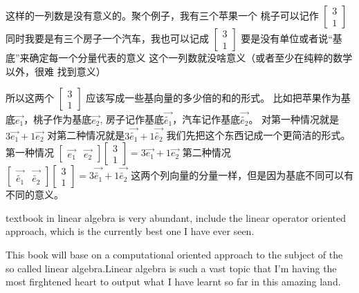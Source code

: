 \documentclass{book}
\begin{document}
\begin{CJK}{UTF8}{gbsn}
    这样的一列数是没有意义的。聚个例子，我有三个苹果一个
    桃子可以记作
    $\left[\begin{matrix}
                3 \\
                1
            \end{matrix}\right]$
    同时我要是有三个房子一个汽车，我也可以记成
    $\left[\begin{matrix}
                3 \\
                1
            \end{matrix}\right]$
    要是没有单位或者说“基底”来确定每一个分量代表的意义
    这个一列数就没啥意义（或者至少在纯粹的数学以外，很难
    找到意义）

    所以这两个
    $\left[\begin{matrix}
                3 \\
                1
            \end{matrix}\right]$
    应该写成一些基向量的多少倍的和的形式。
    比如把苹果作为基底$\vec{e_1}$，桃子作为基底$\vec{e_2}$,
    房子记作基底$\vec{\tilde{e_1}}$，汽车记作基底$\vec{\tilde{e_2}}$。
    对第一种情况就是$3\vec{e_1}+1\vec{e_2}$
    对第二种情况就是$3\vec{\tilde{e_1}}+1\vec{\tilde{e_2}}$
    我们先把这个东西记成一个更简洁的形式。
    第一种情况
    $\left[\begin{matrix}
                \vec{e_1} & \vec{e_2}
            \end{matrix}\right]
        \left[\begin{matrix}
                3 \\
                1
            \end{matrix}\right]=3\vec{e_1}+1\vec{e_2}$
    第二种情况
    $\left[\begin{matrix}
                \vec{\tilde{e_1}} & \vec{\tilde{e_2}}
            \end{matrix}\right]
        \left[\begin{matrix}
                3 \\
                1
            \end{matrix}\right]=3\vec{\tilde{e_1}}+1\vec{\tilde{e_2}}$
    这两个列向量的分量一样，但是因为基底不同可以有
    不同的意义。


    textbook in linear algebra is very abundant,
    include the linear operator oriented approach,
    which is the currently best one I have ever seen.

    This book will base on a computational oriented
    approach to the subject of the so called linear
    algebra.Linear algebra is such a vast topic that
    I'm having the most firghtened heart to output
    what I have learnt so far in this amazing land.


\end{CJK}
\end{document}
